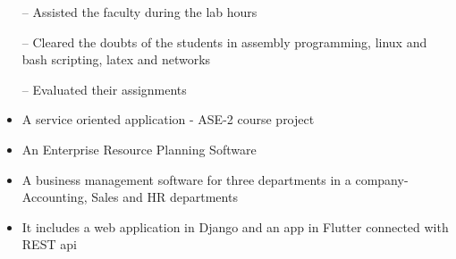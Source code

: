 \documentclass[10pt,a4paper]{altacv}
\begin{document}
\tagline{}

%

\begin{fullwidth}
\makecvheader
\end{fullwidth}

%





\begin{itemize}
    \setlength{\itemindent}{0.5em}
    \item[--]   \small{Assisted the faculty during the lab hours}
    \item[--]   \small{Cleared the doubts of the students in assembly programming, linux and bash scripting, latex and networks}
    \item[--]   \small{Evaluated their assignments}
\end{itemize}

\medskip






\begin{itemize}
  \item \small{A service oriented application - ASE-2 course project }
  \item An Enterprise Resource Planning Software
  \item A business management software for three departments in a company- Accounting, Sales and HR departments
  \item It includes a web application in Django and an app in Flutter connected with REST api
\end{itemize}
\end{document}
